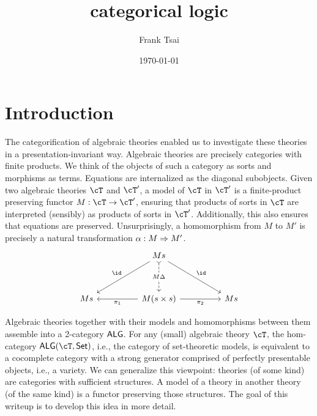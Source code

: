 \documentclass[article,10pt,oneside]{memoir}
\title{categorical logic}
\author{Frank Tsai}
\date{\today}
\begin{document}
\maketitle
\tableofcontents

\section{Introduction}
\label{sec:introduction}

The categorification of algebraic theories enabled us to investigate these theories in a presentation-invariant way.
Algebraic theories are precisely categories with finite products.
We think of the objects of such a category as sorts and morphisms as terms.
Equations are internalized as the diagonal subobjects.
Given two algebraic theories $\cT$ and $\cT'$, a model of $\cT$ in $\cT'$ is a finite-product preserving functor $M : \cT \to \cT'$, ensuring that products of sorts in $\cT$ are interpreted (sensibly) as products of sorts in $\cT'$.
Additionally, this also ensures that equations are preserved.
Unsurprisingly, a homomorphism from $M$ to $M'$ is precisely a natural transformation $\alpha : M \Rightarrow M'$.
\[\begin{tikzcd}
    && Ms \\
    \\
    Ms && {M(s \times s)} && {Ms}
    \arrow["{\pi_{1}}", from=3-3, to=3-1]
    \arrow["{\pi_{2}}"', from=3-3, to=3-5]
    \arrow["\id"', from=1-3, to=3-1]
    \arrow["\id", from=1-3, to=3-5]
    \arrow["M\Delta"{description}, dashed, tail, from=1-3, to=3-3]
  \end{tikzcd}\]

Algebraic theories together with their models and homomorphisms between them assemble into a 2-category $\mathsf{ALG}$.
For any (small) algebraic theory $\cT$, the hom-category $\CAlg(\cT,\CSet)$, i.e., the category of set-theoretic models, is equivalent to a cocomplete category with a strong generator comprised of perfectly presentable objects, i.e., a variety.
We can generalize this viewpoint: theories (of some kind) are categories with sufficient structures.
A model of a theory in another theory (of the same kind) is a functor preserving those structures.
The goal of this writeup is to develop this idea in more detail.
\end{document}
